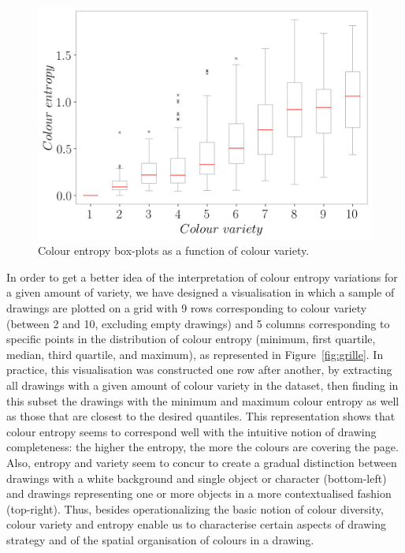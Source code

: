\documentclass[11pt,a4paper]{article}
\begin{document}
\begin{figure}[h!]
	\centering
	\includegraphics[width=\linewidth]{figures/colors-boxplot.png}
	\caption{Colour entropy box-plots as a function of colour variety.}
	\label{fig:entropy_boxplot}
\end{figure}

In order to get a better idea of the interpretation of colour entropy variations for a given amount of variety, we have designed a visualisation in which a sample of drawings are plotted on a grid with 9 rows corresponding to colour variety (between 2 and 10, excluding empty drawings) and 5 columns corresponding to specific points in the distribution of colour entropy (minimum, first quartile, median, third quartile, and maximum), as represented in Figure~\ref{fig:grille}. In practice, this visualisation was constructed one row after another, by extracting all drawings with a given amount of colour variety in the dataset, then finding in this subset the drawings with the minimum and maximum colour entropy as well as those that are closest to the desired quantiles. This representation shows that colour entropy seems to correspond well with the intuitive notion of drawing completeness: the higher the entropy, the more the colours are covering the page. Also, entropy and variety seem to concur to create a gradual distinction between drawings with a white background and single object or character (bottom-left) and drawings representing one or more objects in a more contextualised fashion (top-right). Thus, besides operationalizing the basic notion of colour diversity, colour variety and entropy enable us to characterise certain aspects of drawing strategy and of the spatial organisation of colours in a drawing.
\end{document}
